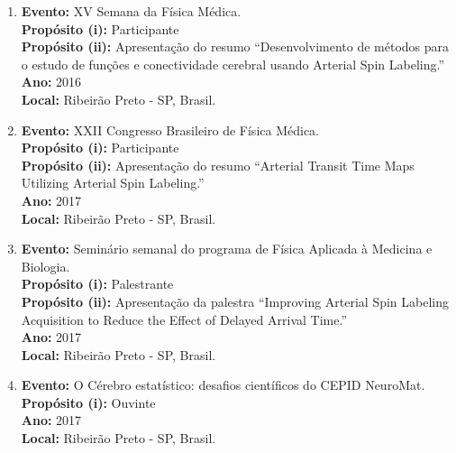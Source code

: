 \documentclass[a4paper,oneside,10pt]{article}
\begin{document}
\begin{enumerate}
        \item   \textbf{Evento:} XV Semana da Física Médica. \mbox{} \\
        \textbf{Propósito (i):} Participante\\
        \textbf{Propósito (ii):} Apresentação do resumo ``Desenvolvimento de métodos para o estudo de funções e conectividade cerebral usando Arterial Spin Labeling.''\\
        \textbf{Ano:} 2016\\
        \textbf{Local:} Ribeirão Preto - SP, Brasil.

        \item   \textbf{Evento:} XXII Congresso Brasileiro de Física Médica. \mbox{} \\
        \textbf{Propósito (i):} Participante\\
        \textbf{Propósito (ii):} Apresentação do resumo ``Arterial Transit Time Maps Utilizing Arterial Spin Labeling.''\\
        \textbf{Ano:} 2017\\
        \textbf{Local:} Ribeirão Preto - SP, Brasil.

        \item   \textbf{Evento:} Seminário semanal do programa de Física Aplicada à Medicina e Biologia. \mbox{} \\
        \textbf{Propósito (i):} Palestrante\\
        \textbf{Propósito (ii):} Apresentação da palestra ``Improving Arterial Spin Labeling Acquisition to Reduce the Effect of Delayed Arrival Time.''\\
        \textbf{Ano:} 2017\\
        \textbf{Local:} Ribeirão Preto - SP, Brasil.

        \item   \textbf{Evento:} O Cérebro estatístico: desafios científicos do CEPID NeuroMat. \mbox{} \\
        \textbf{Propósito (i):} Ouvinte\\
        \textbf{Ano:} 2017\\
        \textbf{Local:} Ribeirão Preto - SP, Brasil.


\end{enumerate}
\end{document}
